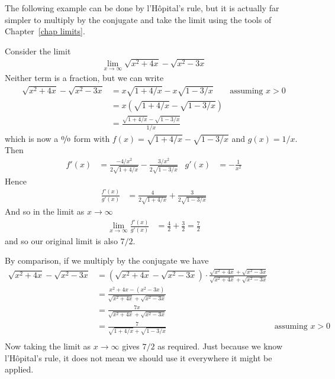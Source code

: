 \begin{enumerate}[(a)]
The following example can be done by l'H\^opital's rule, but it is actually far simpler
to multiply by the conjugate and take the limit using the tools of
Chapter~\ref{chap limits}.
\begin{eg}\label{eg_3_7_5}
Consider the limit
\begin{align*}
  \lim_{x\to \infty} \sqrt{x^2+4x}-\sqrt{x^2-3x}
\end{align*}
Neither term is a fraction, but we can write
\begin{align*}
\sqrt{x^2+4x}-\sqrt{x^2-3x}
&= x\sqrt{1+4/x}-x\sqrt{1-3/x}  & \text{assuming $x>0$}\\
&= x \left( \sqrt{1+4/x}-\sqrt{1-3/x} \right)\\
&= \frac{\sqrt{1+4/x}-\sqrt{1-3/x}}{1/x}
\end{align*}
which is now a $\nicefrac00$ form with $f(x)=\sqrt{1+4/x}-\sqrt{1-3/x}$ and $g(x)=1/x$.
Then
\begin{align*}
f'(x) &= \frac{-4/x^2}{2\sqrt{1+4/x}} - \frac{3/x^2}{2\sqrt{1-3/x}} &
g'(x) &= - \frac{1}{x^2}
\end{align*}
Hence
\begin{align*}
  \frac{f'(x)}{g'(x)} &= \frac{4}{2\sqrt{1+4/x}} + \frac{3}{2\sqrt{1-3/x}}
\end{align*}
And so in the limit as $x\to \infty$
\begin{align*}
  \lim_{x\to \infty} \frac{f'(x)}{g'(x)} &= \frac{4}{2}+\frac{3}{2} =
\frac{7}{2}
\end{align*}
and so our original limit is also $7/2$.

By comparison, if we multiply by the conjugate we have
\begin{align*}
\sqrt{x^2+4x}-\sqrt{x^2-3x}
&= \left( \sqrt{x^2+4x}-\sqrt{x^2-3x}\right)
\cdot \frac{\sqrt{x^2+4x}+\sqrt{x^2-3x}}{\sqrt{x^2+4x}+\sqrt{x^2-3x}}\\
&= \frac{ x^2+4x - (x^2-3x)}{\sqrt{x^2+4x}+\sqrt{x^2-3x}}\\
&= \frac{ 7x}{\sqrt{x^2+4x}+\sqrt{x^2-3x}}\\
&= \frac{7}{\sqrt{1+4/x}+\sqrt{1-3/x}} & \text{assuming $x>0$}\\
\end{align*}
Now taking the limit as $x\to\infty$ gives $7/2$ as required. Just because we know
l'H\^opital's rule, it does not mean we should use it everywhere it might be applied.
\end{eg}



\goodbreak



\end{enumerate}
